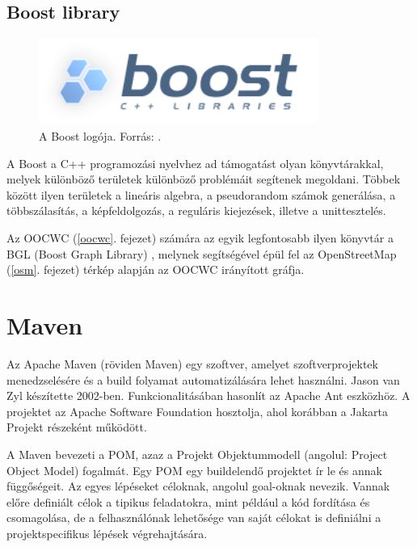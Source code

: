 \documentclass[a4paper,12pt]{report}
\begin{document}
\subsection{Boost library}
\label{boost}

\begin{figure}[ht]
\centerline{
\includegraphics[width=3.6in]{img/boost}}
\caption{A Boost logója. Forrás: \cite{boostlogo}.}
\label{boostlogo}
\end{figure}

\vspace{2mm}
A Boost a C++ programozási nyelvhez ad támogatást olyan könyvtárakkal, melyek különböző területek különböző problémáit segítenek megoldani. Többek között ilyen területek a lineáris algebra, a pseudorandom számok generálása, a többszálasítás, a képfeldolgozás, a reguláris kiejezések, illetve a unittesztelés. 

\vspace{2mm}
Az OOCWC (\ref{oocwc}. fejezet) számára az egyik legfontosabb ilyen könyvtár a BGL (Boost Graph Library) \cite{bgl}, melynek segítségével épül fel az OpenStreetMap \cite{osm} (\ref{osm}. fejezet) térkép alapján az OOCWC irányított gráfja.

\newpage
\section{Maven}
\label{maven}

Az Apache Maven (röviden Maven) egy szoftver, amelyet szoftverprojektek menedzselésére és a build folyamat automatizálására lehet használni. Jason van Zyl készítette 2002-ben. Funkcionalitásában hasonlít az Apache Ant eszközhöz. A projektet az Apache Software Foundation hosztolja, ahol korábban a Jakarta Projekt részeként működött.

\vspace{2mm}
A Maven bevezeti a POM, azaz a Projekt Objektummodell (angolul: Project Object Model) fogalmát. Egy POM egy buildelendő projektet ír le és annak függőségeit. Az egyes lépéseket céloknak, angolul goal-oknak nevezik. Vannak előre definiált célok a tipikus feladatokra, mint például a kód fordítása és csomagolása, de a felhasználónak lehetősége van saját célokat is definiálni a projektspecifikus lépések végrehajtására.
\end{document}
